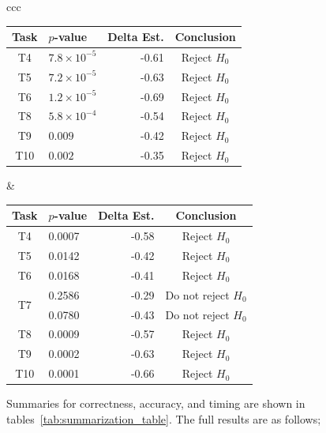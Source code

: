 \begin{table}[htpb]
\begin{tabular}{ccc}
    \begin{tabular}{clrc}
      \toprule
      Task & $p$-value            & Delta Est. & Conclusion\\\midrule
      T4   & $7.8 \times 10^{-5}$ & -0.61      & Reject $H_0$\\
      T5   & $7.2 \times 10^{-5}$ & -0.63      & Reject $H_0$\\
      T6   & $1.2 \times 10^{-5}$ & -0.69      & Reject $H_0$\\
      T8   & $5.8 \times 10^{-4}$ & -0.54      & Reject $H_0$\\
      T9   & $0.009$              & -0.42      & Reject $H_0$\\
      T10  & $0.002$              & -0.35      & Reject $H_0$\\
      \bottomrule
    \end{tabular}
    &
    \begin{tabular}{clrc}
      \toprule
      Task                 & $p$-value & Delta Est. & Conclusion\\\midrule
      T4                   & 0.0007    & -0.58      & Reject $H_0$\\
      T5                   & 0.0142    & -0.42      & Reject $H_0$\\
      T6                   & 0.0168    & -0.41      & Reject $H_0$\\
      \multirow{2}{*}{T7}  & 0.2586    & -0.29      & Do not reject $H_0$\\
                           & 0.0780    & -0.43      & Do not reject $H_0$\\
      T8                   & 0.0009    & -0.57      & Reject $H_0$\\
      T9                   & 0.0002    & -0.63      & Reject $H_0$\\
      T10                  & 0.0001    & -0.66      & Reject $H_0$\\
      \bottomrule
    \end{tabular}
  \end{tabular}
\end{table}

Summaries for correctness, accuracy, and timing are shown in
tables~\ref{tab:summarization_table}.
The full results are as follows;


